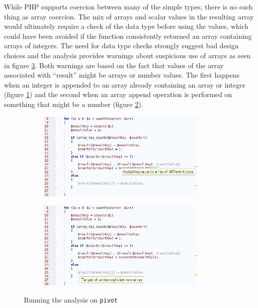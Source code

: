 While PHP supports coercion between many of the simple types, there is no such thing as array coercion. The mix of arrays and scalar values in the resulting array would ultimately require a check of the data type before using the values, which could have been avoided if the function consistently returned an array containing arrays of integers. The need for data type checks strongly suggest bad design choices and the analysis provides warnings about suspicious use of arrays as seen in figure \ref{fig:pivotScreenshot}. Both warnings are based on the fact that values of the array associated with ``result'' might be arrays or number values. The first happens when an integer is appended to an array already containing an array or integer (figure \ref{fig:pivotScreenshot1}) and the second when an array append operation is performed on something that might be a number (figure \ref{fig:pivotScreenshot2}). 

\begin{figure}
\centering
\begin{subfigure}{\textwidth}
\centering
\includegraphics[width=0.9\textwidth]{chapters/caseStudy/screens/pivot1}
\label{fig:pivotScreenshot1}
\end{subfigure}
\begin{subfigure}{\textwidth}
\centering
\includegraphics[width=0.9\textwidth]{chapters/caseStudy/screens/pivot2}
\label{fig:pivotScreenshot2}
\end{subfigure}
\caption{Running the analysis on \texttt{pivot}}
\label{fig:pivotScreenshot}
\end{figure}


